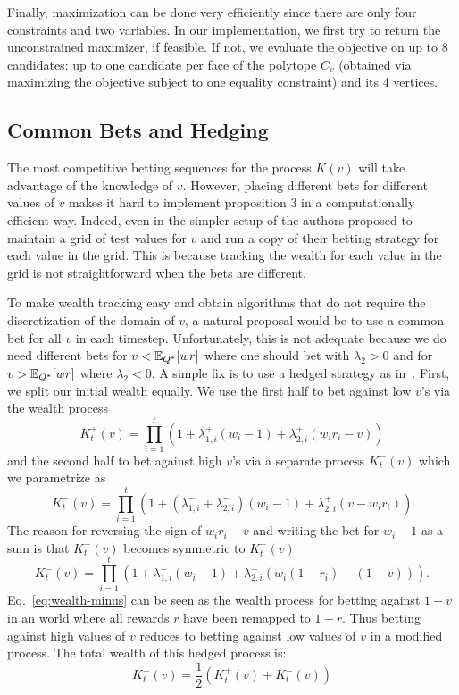 Finally, maximization can be done very efficiently since there are 
only four constraints and two variables. In our implementation, we
first try to return the unconstrained maximizer, if feasible. 
If not, we evaluate the objective on up to 8 candidates: 
up to one candidate per face of the polytope $C_v$ 
(obtained via maximizing the objective subject to one equality constraint) 
and its 4 vertices.

\subsection{Common Bets and Hedging}
The most competitive betting sequences for the process
$K(v)$ will take advantage 
of the knowledge of $v$. However, placing different
bets for different values of $v$ makes it hard 
to implement proposition 3 in a computationally efficient 
way.
Indeed, even in the simpler setup of
\cite{waudby-smith_variance-adaptive_2020}
the authors proposed to maintain a grid of 
test values for $v$ and run a copy of their
betting strategy for each value in the grid.
This is because tracking the wealth for each
value in the grid is not straightforward when
the bets are different.  

To make wealth tracking easy and
obtain algorithms that do not require the 
discretization of the domain of $v$, a natural
proposal would be to use a common bet for 
all $v$ in each timestep. Unfortunately, 
this is not adequate because we do need 
different bets for $v<\mathbb{E}_{Q^*}[wr]$ where
one should bet with $\lambda_2 > 0$ and for 
$v>\mathbb{E}_{Q^*}[wr]$ where $\lambda_2 < 0$. 
A simple fix is to use a hedged 
strategy as in~\cite{waudby-smith_variance-adaptive_2020}.
First, we split our initial wealth equally.
We use the first half to bet against low $v$'s
via the wealth process
\[
K_t^{+}(v) = \prod_{i=1}^t \left(1+\lambda_{1,i}^{+}(w_i-1)+\lambda_{2,i}^{+}(w_i r_i -v)\right)
\]
and the second half to bet against high $v$'s
via a separate process $K_t^{-}(v)$ which we
parametrize as
\[
K_t^{-}(v) = \prod_{i=1}^t \left(1+(\lambda_{1,i}^{-}+\lambda_{2,i}^{-})(w_i-1)+\lambda_{2,i}^{+}(v-w_i r_i)\right)
\]
The reason for reversing the sign of $w_i r_i -v$ and 
writing the bet for $w_i-1$ as a sum is that $K_t^{-}(v)$
becomes symmetric to $K_t^{+}(v)$
\begin{equation}
K_t^{-}(v) = \prod_{i=1}^t \left(1+\lambda_{1,i}^{-}(w_i-1)+\lambda_{2,i}^{-}(w_i (1-r_i) -(1-v))\right).
\label{eq:wealth-minus} 
\end{equation}
Eq.~\eqref{eq:wealth-minus} 
can be seen as the wealth process for betting against $1-v$ 
in an world where all rewards $r$ have been remapped 
to $1-r$. Thus betting against high values of $v$ 
reduces to betting against low values of $v$ in a
modified process. The total wealth of this hedged process is:
\begin{equation}
K_t^{\pm}(v) = \frac{1}{2} (K_t^{+}(v) + K_t^{-}(v))
\label{eq:hedged}
\end{equation}

